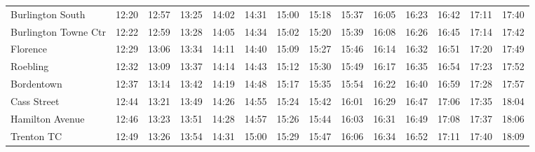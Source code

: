 \begin{center}
\begin{tabular}{@{}lrrrrrrrrrrrrr@{}}
Burlington South & 12:20 & 12:57 & 13:25 & 14:02 & 14:31 & 15:00 & 15:18 & 15:37 & 16:05 & 16:23 & 16:42 & 17:11 & 17:40 \\
Burlington Towne Ctr & 12:22 & 12:59 & 13:28 & 14:05 & 14:34 & 15:02 & 15:20 & 15:39 & 16:08 & 16:26 & 16:45 & 17:14 & 17:42 \\
Florence & 12:29 & 13:06 & 13:34 & 14:11 & 14:40 & 15:09 & 15:27 & 15:46 & 16:14 & 16:32 & 16:51 & 17:20 & 17:49 \\
Roebling & 12:32 & 13:09 & 13:37 & 14:14 & 14:43 & 15:12 & 15:30 & 15:49 & 16:17 & 16:35 & 16:54 & 17:23 & 17:52 \\
Bordentown & 12:37 & 13:14 & 13:42 & 14:19 & 14:48 & 15:17 & 15:35 & 15:54 & 16:22 & 16:40 & 16:59 & 17:28 & 17:57 \\
Cass Street & 12:44 & 13:21 & 13:49 & 14:26 & 14:55 & 15:24 & 15:42 & 16:01 & 16:29 & 16:47 & 17:06 & 17:35 & 18:04 \\
Hamilton Avenue & 12:46 & 13:23 & 13:51 & 14:28 & 14:57 & 15:26 & 15:44 & 16:03 & 16:31 & 16:49 & 17:08 & 17:37 & 18:06 \\
Trenton TC & 12:49 & 13:26 & 13:54 & 14:31 & 15:00 & 15:29 & 15:47 & 16:06 & 16:34 & 16:52 & 17:11 & 17:40 & 18:09 \\
\bottomrule\end{tabular}\end{center}
